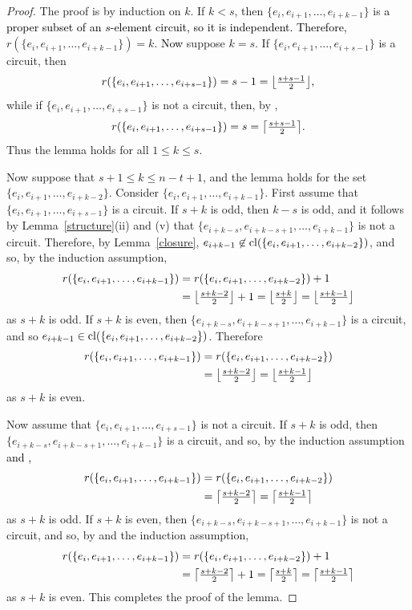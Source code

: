\documentclass[11pt]{amsart}
\newcommand{\cl}{{\rm cl}}
\newcommand{\blue}{\textcolor{black}}
\newcommand{\bloo}{\textcolor{black}}
\DeclarePairedDelimiter\ceil{\lceil}{\rceil}
\DeclarePairedDelimiter\floor{\lfloor}{\rfloor}
\begin{document}
\begin{proof}
The proof is by induction on $k$. If $k < s$, then $\{e_i, e_{i+1}, \ldots, e_{i+k-1}\}$ is \bloo{a proper subset of an $s$-element circuit, so it is independent. Therefore,} $r(\{e_i, e_{i+1}, \ldots, e_{i+k-1}\}) = k$. \bloo{Now} suppose $k=s$. If $\{e_i, e_{i+1}, \ldots, e_{i+s-1}\}$ is a circuit, then
$$r(\{e_i, e_{i+1}, \ldots, e_{i+s-1}\})=s-1=\floor*{{\textstyle \frac{s+s-1}{2}}},$$
while if $\{e_i, e_{i+1}, \ldots, e_{i+s-1}\}$ is not a circuit, then, by ,
$$r(\{e_i, e_{i+1}, \ldots, e_{i+s-1}\})=s=\ceil*{{\textstyle \frac{s+s-1}{2}}}.$$
Thus the lemma holds for all $1\le k\le s$.

Now suppose that $s+1\le k\le n-t+1$, and the lemma holds for the set $\{e_i, e_{i+1}, \ldots, e_{i+k-2}\}$. Consider $\{e_i, e_{i+1}, \ldots, e_{i+k-1}\}$. First assume that $\{e_i, e_{i+1}, \ldots, e_{i+s-1}\}$ is a circuit. If $s+k$ is odd, then $k-s$ is odd, and it follows by Lemma~\ref{structure}(ii) and (v) that $\{e_{i+k-s}, e_{i+k-s+1}, \ldots, e_{i+k-1}\}$ is not a circuit. Therefore, by Lemma~\ref{closure}, $e_{i+k-1}\not\in \cl(\{e_i, e_{i+1}, \ldots, e_{i+k-2}\})$, and so, by the induction assumption,
\begin{align*}
r(\{e_i, e_{i+1}, \ldots, e_{i+k-1}\}) & = r(\{e_i, e_{i+1}, \ldots, e_{i+k-2}\}) + 1 \\
& = \floor*{{\textstyle \frac{s+k-2}{2}}}+1 = \floor*{{\textstyle \frac{s+k}{2}}} = \floor*{{\textstyle \frac{s+k-1}{2}}}
\end{align*}
as $s+k$ is odd. If $s+k$ is even, then $\{e_{i+k-s}, e_{i+k-s+1}, \ldots, e_{i+k-1}\}$ is a circuit, and so $e_{i+k-1}\in \cl(\{e_i, e_{i+1}, \ldots, e_{i+k-2}\})$. Therefore
\begin{align*}
r(\{e_i, e_{i+1}, \ldots, e_{i+k-1}\}) & = r(\{e_i, e_{i+1}, \ldots, e_{i+k-2}\}) \\
& = \floor*{{\textstyle \frac{s+k-2}{2}}} = \floor*{{\textstyle \frac{s+k-1}{2}}}
\end{align*}
as $s+k$ is even.

Now assume that $\{e_i, e_{i+1}, \ldots, e_{i+s-1}\}$ is not a circuit. If $s+k$ is odd, then $\{e_{i+k-s}, e_{i+k-s+1}, \ldots,e_{i+k-1}\}$ is a circuit, and so, by the induction assumption \blue{and ,}
\begin{align*}
r(\{e_i, e_{i+1}, \ldots, e_{i+k-1}\}) & = r(\{e_i, e_{i+1}, \ldots, e_{i+k-2}\}) \\
& = \ceil*{{\textstyle \frac{s+k-2}{2}}} =  \ceil*{{\textstyle \frac{s+k-1}{2}}}
\end{align*}
as $s+k$ is odd. If $s+k$ is even, then $\{e_{i+k-s}, e_{i+k-s+1}, \ldots, e_{i+k-1}\}$ is not a circuit, and so, by  and the induction assumption,
\begin{align*}
r(\{e_i, e_{i+1}, \ldots, e_{i+k-1}\}) & = r(\{e_i, e_{i+1}, \ldots, e_{i+k-2}\}) + 1 \\
& = \ceil*{{\textstyle \frac{s+k-2}{2}}} + 1 = \ceil*{{\textstyle \frac{s+k}{2}}} = \ceil*{{\textstyle \frac{s+k-1}{2}}}
\end{align*}
as $s+k$ is even. This completes the proof of the lemma.
\end{proof}
\end{document}

